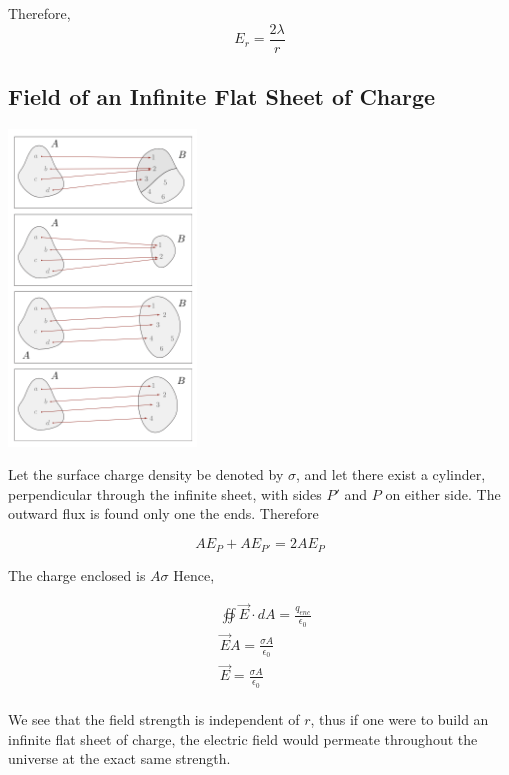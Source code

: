 \documentclass[svgnames]{article}
\begin{document}
Therefore, \\

\[ E_r = \frac{2 \lambda}{r} \] 

\subsection{Field of an Infinite Flat Sheet of Charge}

\vspace{20px} 

\begin{center}
\includegraphics[width = 50mm]{ss.png}
\end{center} 


\vspace{20px}

Let the surface charge density be denoted by $\sigma$, and let there exist a cylinder, perpendicular through the infinite sheet, with sides $P'$ and $P$ on either side. The outward flux is found only one the ends. Therefore

\[ AE_P + AE_{P'} = 2AE_P \] 

The charge enclosed is $A\sigma$ Hence, 

\begin{align*}
&\oiint \vec{E} \cdot dA = \frac{q_{enc}}{\epsilon_0} \\ 
&\vec{E} A = \frac{\sigma A}{\epsilon_0} \\
&\vec{E} = \frac{\sigma A}{\epsilon_0} 
\end{align*} \\

We see that the field strength is independent of $r$, thus if one were to build an infinite flat sheet of charge, the electric field would permeate throughout the universe at the exact same strength. 
\end{document}
